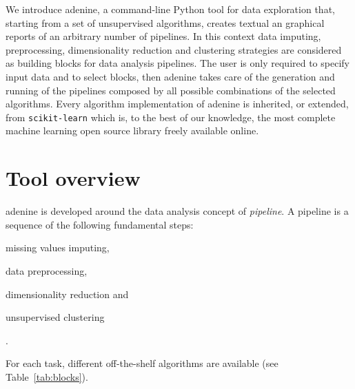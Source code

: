 \documentclass[twoside,11pt]{article}
\makeatletter
\newcommand{\ade}{{\sc adenine}\@\xspace}
\newcommand{\py}{{Python}\@\xspace}
\makeatother
\begin{document}
We introduce \ade, a command-line \py tool for data exploration that, starting from a set of unsupervised algorithms, creates textual an graphical reports of an arbitrary number of pipelines. In this context data imputing, preprocessing, dimensionality reduction and clustering strategies are considered as building blocks for data analysis pipelines. The user is only required to specify input data and to select blocks, then \ade takes care of the generation and running of the pipelines composed by all possible combinations of the selected algorithms. Every algorithm implementation of \ade is inherited, or extended, from \texttt{scikit-learn} \citep{scikit-learn} which is, to the best of our knowledge, the most complete machine learning open source library freely available online.


\section{Tool overview}\label{sec:implem}
\ade is developed around the data analysis concept of \emph{pipeline}. A pipeline is a sequence of the following fundamental steps:
\begin{enumerate*}[label=(\roman*)]
  \item missing values imputing,
  \item data preprocessing,
  \item dimensionality reduction and
  \item unsupervised clustering
\end{enumerate*}.

For each task, different off-the-shelf algorithms are available (see Table~\ref{tab:blocks}).%

\end{document}
